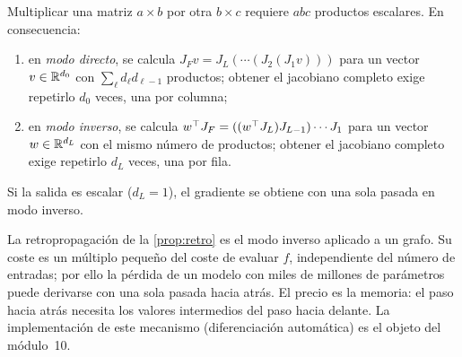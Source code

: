 \begin{proposicion}\label{prop:modos}
Multiplicar una matriz $a\times b$ por otra $b\times c$ requiere $abc$ productos escalares. En consecuencia:
\begin{enumerate}
  \item en \emph{modo directo}, se calcula $J_F v=J_L(\cdots(J_2(J_1 v)))$ para un vector $v\in\mathbb{R}^{d_0}$ con $\sum_\ell d_\ell d_{\ell-1}$ productos; obtener el jacobiano completo exige repetirlo $d_0$ veces, una por columna;
  \item en \emph{modo inverso}, se calcula $w^{\top} J_F=((w^{\top} J_L)J_{L-1})\cdots J_1$ para un vector $w\in\mathbb{R}^{d_L}$ con el mismo número de productos; obtener el jacobiano completo exige repetirlo $d_L$ veces, una por fila.
\end{enumerate}
Si la salida es escalar ($d_L=1$), el gradiente se obtiene con una sola pasada en modo inverso.
\end{proposicion}

La retropropagación de la \cref{prop:retro} es el modo inverso aplicado a un grafo. Su coste es un múltiplo pequeño del coste de evaluar $f$, independiente del número de entradas; por ello la pérdida de un modelo con miles de millones de parámetros puede derivarse con una sola pasada hacia atrás. El precio es la memoria: el paso hacia atrás necesita los valores intermedios del paso hacia delante. La implementación de este mecanismo (diferenciación automática) es el objeto del módulo~10.

\addtocounter{definicion}{1}%

